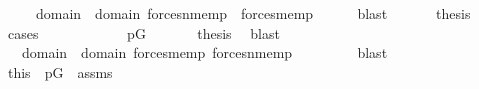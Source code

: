 \begin{isabellebody}
\ \ \ \ {\isacharparenleft}{\kern0pt}{}{\isacharparenright}{\kern0pt}\ {\isachardoublequoteopen}{\isasymexists}{\isasymsigma}{\isasymin}domain{\isacharparenleft}{\kern0pt}{\isasymtau}{\isacharparenright}{\kern0pt}\ {\isasymunion}\ domain{\isacharparenleft}{\kern0pt}{\isasymtheta}{\isacharparenright}{\kern0pt}{\isachardot}{\kern0pt}\ forces{\isacharunderscore}{\kern0pt}nmem{\isacharparenleft}{\kern0pt}p{\isacharcomma}{\kern0pt}{\isasymsigma}{\isacharcomma}{\kern0pt}{\isasymtau}{\isacharparenright}{\kern0pt}\ {\isasymand}\ forces{\isacharunderscore}{\kern0pt}mem{\isacharparenleft}{\kern0pt}p{\isacharcomma}{\kern0pt}{\isasymsigma}{\isacharcomma}{\kern0pt}{\isasymtheta}{\isacharparenright}{\kern0pt}{\isachardoublequoteclose}\isanewline
\ \ \ \ \isamarkupfalse%
\ blast\isanewline
\ \ \isamarkupfalse%
\isanewline
\ \ \isamarkupfalse%
\ {\isacharquery}{\kern0pt}thesis\isanewline
\ \ \isamarkupfalse%
\ {\isacharparenleft}{\kern0pt}cases{\isacharparenright}{\kern0pt}\isanewline
\ \ \ \ \isamarkupfalse%
\ {}\isanewline
\ \ \ \ \isamarkupfalse%
\ {\isacartoucheopen}p{\isasymin}G{\isacartoucheclose}\ \isanewline
\ \ \ \ \isamarkupfalse%
\ {\isacharquery}{\kern0pt}thesis\ \isamarkupfalse%
\ blast\isanewline
\ \ \isamarkupfalse%
\isanewline
\ \ \ \ \isamarkupfalse%
\ {}\isanewline
\ \ \ \ \isamarkupfalse%
\ \isanewline
\ \ \ \ \isamarkupfalse%
\ {\isasymsigma}\ \ {\isachardoublequoteopen}{\isasymsigma}{\isasymin}domain{\isacharparenleft}{\kern0pt}{\isasymtau}{\isacharparenright}{\kern0pt}\ {\isasymunion}\ domain{\isacharparenleft}{\kern0pt}{\isasymtheta}{\isacharparenright}{\kern0pt}{\isachardoublequoteclose}\ {\isachardoublequoteopen}forces{\isacharunderscore}{\kern0pt}mem{\isacharparenleft}{\kern0pt}p{\isacharcomma}{\kern0pt}{\isasymsigma}{\isacharcomma}{\kern0pt}{\isasymtau}{\isacharparenright}{\kern0pt}{\isachardoublequoteclose}\ {\isachardoublequoteopen}forces{\isacharunderscore}{\kern0pt}nmem{\isacharparenleft}{\kern0pt}p{\isacharcomma}{\kern0pt}{\isasymsigma}{\isacharcomma}{\kern0pt}{\isasymtheta}{\isacharparenright}{\kern0pt}{\isachardoublequoteclose}\ \isanewline
\ \ \ \ \ \ \isamarkupfalse%
\ blast\isanewline
\ \ \ \ \isamarkupfalse%
\ \isamarkupfalse%
\ this\ \ {\isacartoucheopen}p{\isasymin}G{\isacartoucheclose}\ \ assms\isanewline

\end{isabellebody}
